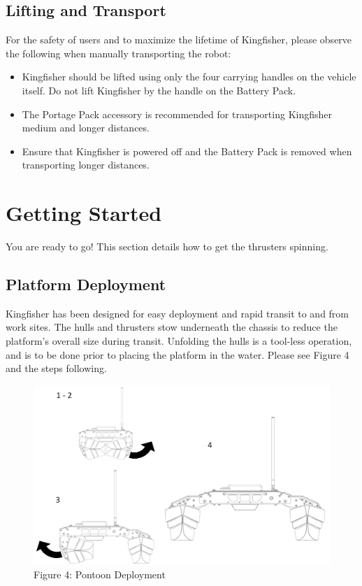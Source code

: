 \documentclass[]{clearpath-latex/clearpath-manual}
\begin{document}
\subsection{Lifting and Transport}
For the safety of users and to maximize the lifetime of Kingfisher, please observe the following when manually transporting the robot:

\begin{itemize}[nolistsep]
	\item Kingfisher should be lifted using only the four carrying handles on the vehicle itself. Do not lift Kingfisher by the handle on the Battery Pack.
	\item The Portage Pack accessory is recommended for transporting Kingfisher medium and longer distances.
	\item Ensure that Kingfisher is powered off and the Battery Pack is removed when transporting longer distances.
\end{itemize}

\newpage

\section{Getting Started}
You are ready to go! This section details how to get the thrusters spinning.

\subsection{Platform Deployment}
Kingfisher has been designed for easy deployment and rapid transit to and from work sites. The hulls and thrusters stow underneath the chassis to reduce the platform's overall size during transit. Unfolding the hulls is a tool-less operation, and is to be done prior to placing the platform in the water. Please see Figure 4 and the steps following.

\begin{figure}[h]
  \centering
  \includegraphics[width=0.75\linewidth]{kf_pontoon.PNG}
  \caption{Figure 4: Pontoon Deployment}
  \label{kf_pontoon}
\end{figure}
\end{document}
